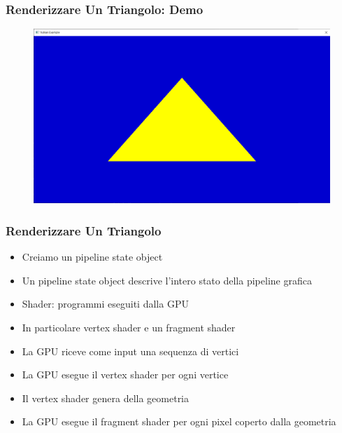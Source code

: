 \begin{frame}
\frametitle{Renderizzare Un Triangolo: Demo}
\begin{figure}[ht]
    \centering
    \includegraphics[scale=0.25]{images/SlidesTriangle/Triangle.png}
\end{figure}
\end{frame}

\begin{frame}
\frametitle{Renderizzare Un Triangolo}
\begin{itemize}
\item Creiamo un pipeline state object
\item Un pipeline state object descrive l'intero stato della pipeline grafica
\item Shader: programmi eseguiti dalla GPU
\item In particolare vertex shader e un fragment shader
\item La GPU riceve come input una sequenza di vertici
\item La GPU esegue il vertex shader per ogni vertice
\item Il vertex shader genera della geometria
\item La GPU esegue il fragment shader per ogni pixel coperto dalla geometria
\end{itemize}
\end{frame}
